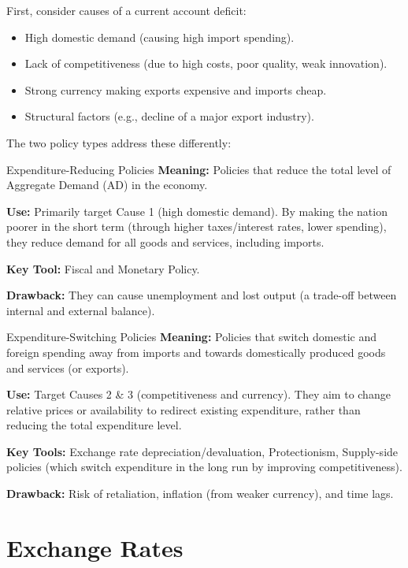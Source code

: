 \documentclass[11pt, a4paper, twoside]{book}
\begin{document}
First, consider causes of a current account deficit:
\begin{itemize}
  \item High domestic demand (causing high import spending).
  \item Lack of competitiveness (due to high costs, poor quality, weak innovation).
  \item Strong currency making exports expensive and imports cheap.
  \item Structural factors (e.g., decline of a major export industry).
\end{itemize}

The two policy types address these differently:

\begin{keyterm}{Expenditure-Reducing Policies}
\textbf{Meaning:} Policies that reduce the total level of Aggregate Demand (AD) in the economy.

\textbf{Use:} Primarily target Cause 1 (high domestic demand). By making the nation poorer in the short term (through higher taxes/interest rates, lower spending), they reduce demand for all goods and services, including imports.

\textbf{Key Tool:} Fiscal and Monetary Policy.

\textbf{Drawback:} They can cause unemployment and lost output (a trade-off between internal and external balance).
\end{keyterm}

\begin{keyterm}{Expenditure-Switching Policies}
\textbf{Meaning:} Policies that switch domestic and foreign spending away from imports and towards domestically produced goods and services (or exports).

\textbf{Use:} Target Causes 2 \& 3 (competitiveness and currency). They aim to change relative prices or availability to redirect existing expenditure, rather than reducing the total expenditure level.

\textbf{Key Tools:} Exchange rate depreciation/devaluation, Protectionism, Supply-side policies (which switch expenditure in the long run by improving competitiveness).

\textbf{Drawback:} Risk of retaliation, inflation (from weaker currency), and time lags.
\end{keyterm}

\section{Exchange Rates}
\end{document}
